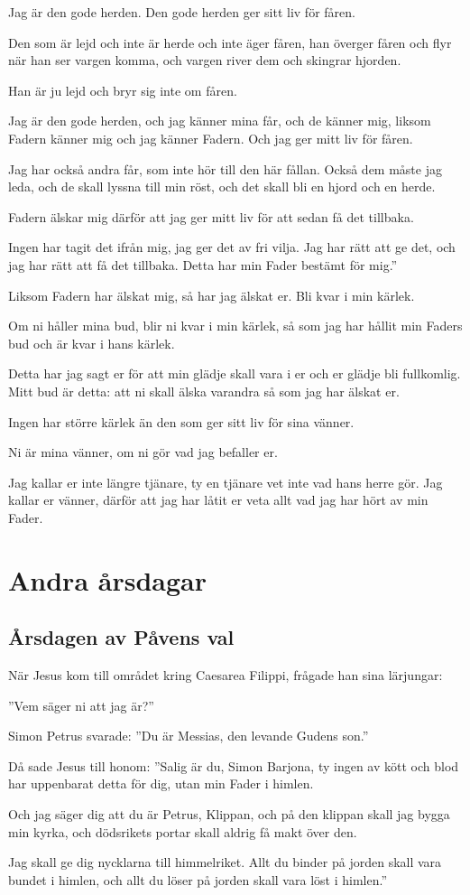 {Jag är den gode herden. Den gode herden ger sitt liv för fåren.}

Den som är lejd och inte är herde och inte äger fåren, han överger fåren och flyr när han ser vargen komma, och vargen river dem och skingrar hjorden.

Han är ju lejd och bryr sig inte om fåren.

Jag är den gode herden, och jag känner mina får, och de känner mig,
liksom Fadern känner mig och jag känner Fadern. Och jag ger mitt liv för fåren.

Jag har också andra får, som inte hör till den här fållan. Också dem måste jag leda, och de skall lyssna till min röst, och det skall bli en hjord och en herde.

Fadern älskar mig därför att jag ger mitt liv för att sedan få det tillbaka.

Ingen har tagit det ifrån mig, jag ger det av fri vilja. Jag har rätt att ge det, och jag har rätt att få det tillbaka. Detta har min Fader bestämt för mig.''


{Liksom Fadern har älskat mig, så har jag älskat er. Bli kvar i min kärlek.}

Om ni håller mina bud, blir ni kvar i min kärlek, så som jag har hållit min Faders bud och är kvar i hans kärlek.

Detta har jag sagt er för att min glädje skall vara i er och er glädje bli fullkomlig.
Mitt bud är detta: att ni skall älska varandra så som jag har älskat er.

Ingen har större kärlek än den som ger sitt liv för sina vänner.

Ni är mina vänner, om ni gör vad jag befaller er.

Jag kallar er inte längre tjänare, ty en tjänare vet inte vad hans herre gör. Jag kallar er vänner, därför att jag har låtit er veta allt vad jag har hört av min Fader. 

\newpage
\section{Andra årsdagar}
\subsection{Årsdagen av Påvens val}
{
När Jesus kom till området kring Caesarea Filippi, frågade han sina lärjungar:}

''Vem säger ni att jag är?''

Simon Petrus svarade: ''Du är Messias, den levande Gudens son.''

Då sade Jesus till honom: ''Salig är du, Simon Barjona, ty ingen av kött och blod har uppenbarat detta för dig, utan min Fader i himlen.

Och jag säger dig att du är Petrus, Klippan, och på den klippan skall jag bygga min kyrka, och dödsrikets portar skall aldrig få makt över den.

Jag skall ge dig nycklarna till himmelriket. Allt du binder på jorden skall vara bundet i himlen, och allt du löser på jorden skall vara löst i himlen.''